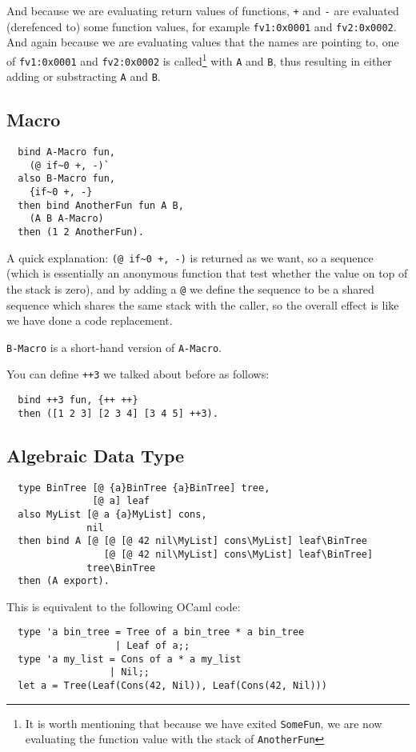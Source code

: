 \documentclass{book}
\begin{document}
And because we are evaluating return values of functions, \texttt{+} and \texttt{-} are evaluated (derefenced to) some function values, for example \texttt{fv1:0x0001} and \texttt{fv2:0x0002}. And again because we are evaluating values that the names are pointing to, one of \texttt{fv1:0x0001} and \texttt{fv2:0x0002} is called\footnote{It is worth mentioning that because we have exited \texttt{SomeFun}, we are now evaluating the function value with the stack of \texttt{AnotherFun}} with \texttt{A} and \texttt{B}, thus resulting in either adding or substracting \texttt{A} and \texttt{B}.

\subsection{Macro}
\label{ssec:macro}
\begin{verbatim}
  bind A-Macro fun,
    (@ if~0 +, -)`
  also B-Macro fun,
    {if~0 +, -}
  then bind AnotherFun fun A B,
    (A B A-Macro)
  then (1 2 AnotherFun).
\end{verbatim}

A quick explanation: \texttt{(@ if\textasciitilde 0 +, -)} is returned as we want, so a sequence (which is essentially an anonymous function that test whether the value on top of the stack is zero), and by adding a \texttt{@} we define the sequence to be a shared sequence which shares the same stack with the caller, so the overall effect is like we have done a code replacement.

\texttt{B-Macro} is a short-hand version of \texttt{A-Macro}.

You can define \texttt{++3} we talked about before as follows:
\begin{verbatim}
  bind ++3 fun, {++ ++}
  then ([1 2 3] [2 3 4] [3 4 5] ++3).
\end{verbatim}

\subsection{Algebraic Data Type}
\label{ssec:adt-example}
\begin{verbatim}
  type BinTree [@ {a}BinTree {a}BinTree] tree,
               [@ a] leaf
  also MyList [@ a {a}MyList] cons,
              nil
  then bind A [@ [@ [@ 42 nil\MyList] cons\MyList] leaf\BinTree
                 [@ [@ 42 nil\MyList] cons\MyList] leaf\BinTree]
              tree\BinTree
  then (A export).
\end{verbatim}

This is equivalent to the following OCaml code:
\begin{verbatim}
  type 'a bin_tree = Tree of a bin_tree * a bin_tree
                   | Leaf of a;;
  type 'a my_list = Cons of a * a my_list
                  | Nil;;
  let a = Tree(Leaf(Cons(42, Nil)), Leaf(Cons(42, Nil)))
\end{verbatim}
\end{document}
